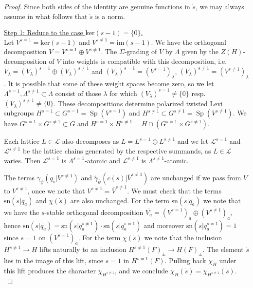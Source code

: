 \documentclass{article}
\def\mc#1{\mathcal{#1}}
\def\tx#1{\textrm{#1}}
\def\ol#1{\overline{#1}}
\def\ul#1{\underline{#1}}
\DeclareMathOperator{\Sp}{Sp}
\theoremstyle{definition}
\numberwithin{equation}{subsection}
\renewcommand{\-}{\hyp{}}
\begin{document}
\begin{proof}
	Since both sides of the identity are genuine functions in $\dot s$, we may always assume in what follows that $\dot s$ is a norm.

	\ul{Step 1: Reduce to the case $\tx{ker}(s-1)=\{0\}$.}\\
	Let $V^{s=1}=\tx{ker}(s-1)$ and $V^{s \neq 1}=\tx{im}(s-1)$. We have the orthogonal decomposition $V=V^{s=1} \oplus V^{s \neq 1}$. The $\Sigma$-grading of $V$ by $\Lambda$ given by the $Z(H)$-decomposition of $V$ into weights is compatible with this decomposition, i.e. $V_\lambda=(V_\lambda)^{s=1} \oplus (V_\lambda)^{s \neq 1}$ and $(V_\lambda)^{s=1}=(V^{s=1})_\lambda$, $(V_\lambda)^{s \neq 1}=(V^{s \neq 1})_\lambda$. It is possible that some of these weight spaces become zero, so we let $\Lambda^{s=1}, \Lambda^{s \neq 1} \subset \Lambda$ consist of those $\lambda$ for which $(V_\lambda)^{s=1} \neq \{0\}$ resp. $(V_\lambda)^{s \neq 1} \neq \{0\}$. These decompositions determine polarized twisted Levi subgroups $H^{s=1} \subset G^{s=1}=\Sp(V^{s=1})$ and $H^{s \neq 1} \subset G^{s \neq 1}=\Sp(V^{s \neq 1})$. We have $G^{s=1} \times G^{s \neq 1} \subset G$ and $H^{s=1} \times H^{s \neq 1} = H \cap (G^{s=1} \times G^{s \neq 1})$.
	
	Each lattice $L \in \mc{L}$ also decomposes as $L=L^{s=1} \oplus L^{s \neq 1}$ and we let $\mc{L}^{s=1}$ and $\mc{L}^{s \neq 1}$ be the lattice chains generated by the respective summands, as $L \in \mc{L}$ varies. Then $\mc{L}^{s=1}$ is $\Lambda^{s=1}$-atomic and $\mc{L}^{s \neq 1}$ is $\Lambda^{s \neq 1}$-atomic.

	The terms $\gamma_\psi(q_{\dot s}|V^{s \neq 1})$ and $\tilde\gamma_{\bar\psi}(c(s)|\ol{V}^{s \neq 1})$ are unchanged if we pass from $V$ to $V^{s\neq 1}$, once we note that $\ol{V^{s\neq 1}}=\ol{V}^{s \neq 1}$. We must check that the terms $\tx{sn}(s|\ol{q_a})$ and $\chi(\dot s)$ are also unchanged. For the term $\tx{sn}(s|\ol{q_a})$ we note that we have the $s$-stable orthogonal decomposition $\ol{V_a} = \ol{(V^{s=1})_a} \oplus \ol{(V^{s \neq 1})_a}$, hence $\tx{sn}(s|\ol{q_a})=\tx{sn}(s|\ol{q_a^{s \neq 1}}) \cdot \tx{sn}(s|\ol{q_a^{s=1}})$ and moreover $\tx{sn}(s|\ol{q_a^{s=1}})=1$ since $s=1$ on $(V^{s=1})_a$. For the term $\chi(\dot s)$ we note that the inclusion $H^{s \neq 1} \to H$  lifts naturally to an inclusion $H^{s \neq 1}(F)_\pm \to H(F)_\pm$. The element $\dot s$ lies in the image of this lift, since $s=1$ in $H^{s=1}(F)$. Pulling back $\chi_H$ under this lift produces the character $\chi_{H^{s \neq 1}}$, and we conclude $\chi_H(\dot s)=\chi_{H^{s \neq 1}}(\dot s)$. \\




\end{proof}
\end{document}
